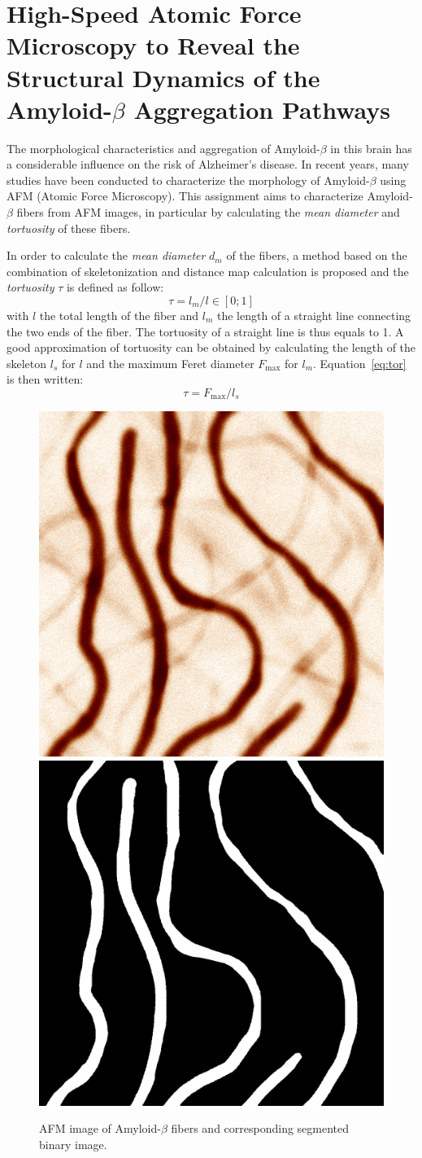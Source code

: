 \documentclass{article}
\begin{document}
\part*{High-Speed Atomic Force Microscopy to Reveal the Structural Dynamics of the Amyloid-$\beta$ Aggregation Pathways}
The morphological characteristics and aggregation of Amyloid-$\beta$ in this brain has a considerable influence on the risk of Alzheimer's disease. In recent years, many studies have been conducted to characterize the morphology of Amyloid-$\beta$ using AFM (Atomic Force Microscopy). This assignment aims to characterize Amyloid-$\beta$ fibers from AFM images, in particular by calculating the \textit{mean diameter} and \textit{tortuosity} of these fibers. 

In order to calculate the \textit{mean diameter} $d_m$ of the fibers, a method based on the combination of skeletonization and distance map calculation is proposed and the \textit{tortuosity} $\tau$ is defined as follow:
\begin{equation}
\tau = l_m/l \in [0;1]
\label{eq:tor}
\end{equation}
with $l$ the total length of the fiber and $l_m$ the length of a straight line connecting the two ends of the fiber. The tortuosity of a straight line is thus equals to 1. A good approximation of tortuosity can be obtained by calculating the length of the skeleton $l_s$ for $l$ and the maximum Feret diameter $F_{\max}$ for $l_m$. Equation~\eqref{eq:tor} is then written:
\begin{equation}
\tau = F_{\max} / l_s
\label{eq:tor2}
\end{equation}


\begin{figure}[!h]
\begin{center}
\includegraphics[width=.3\textwidth]{amyloid_b_afm.png}
\qquad
\includegraphics[width=.3\textwidth]{amyloid_b_bw.png}
\label{Fig:AFM_and_BW}
\caption{AFM image of Amyloid-$\beta$ fibers and corresponding segmented binary image.}
\end{center}
\end{figure}
\end{document}
